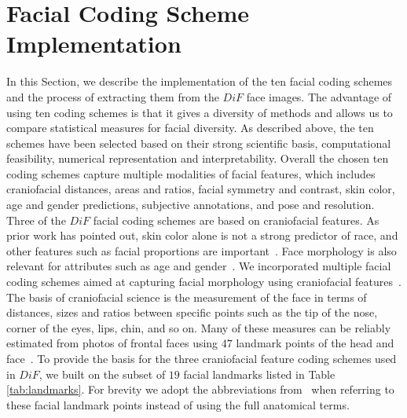 \documentclass[letterpaper,11pt]{article}
\begin{document}

\section{Facial Coding Scheme Implementation}  \label{sec:codingschemes}

In this Section, we describe the implementation of the ten facial coding schemes and the process of extracting them from the $DiF$ face images.  The advantage of using ten coding schemes is that it gives a diversity of methods and allows us to compare statistical measures for facial diversity.  As described above, the ten schemes have been selected based on their strong scientific basis, computational feasibility, numerical representation and interpretability.  Overall the chosen ten coding schemes capture multiple modalities of facial features, which includes craniofacial distances, areas and ratios, facial symmetry and contrast, skin color, age and gender predictions, subjective annotations, and pose and resolution.  Three of the $DiF$ facial coding schemes are based on craniofacial features.  As prior work has pointed out, skin color alone is not a strong predictor of race, and other features such as facial proportions are important~\cite{learning_race14,race_variation79,anthro_woman01,facial_contrast17}.  Face morphology is also relevant for attributes such as age and gender~\cite{face_age_modeling06}.  We incorporated multiple facial coding schemes aimed at capturing facial morphology using craniofacial features~\cite{anthropometry_book94,anthropmetry05,face_age_modeling06}.  The basis of craniofacial science is the measurement of the face in terms of distances, sizes and ratios between specific points such as the tip of the nose, corner of the eyes, lips, chin, and so on.  Many of these measures can be reliably estimated from photos of frontal faces using $47$ landmark points of the head and face~\cite{anthropometry_book94}.  To provide the basis for the three craniofacial feature coding schemes used in $DiF$, we built on the subset of $19$ facial landmarks listed in Table \ref{tab:landmarks}.  For brevity we adopt the abbreviations from~\cite{anthropometry_book94} when referring to these facial landmark points instead of using the full anatomical terms.
\end{document}
